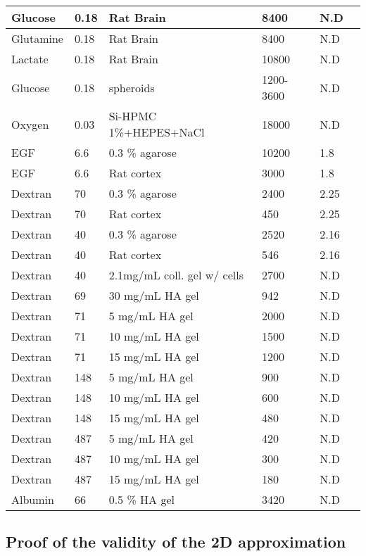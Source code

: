 \documentclass[11pt,a4paper]{article}
\begin{document}
\begin{center}
\begin{tabular}{ |p{18mm}|p{18mm}|p{35mm}|p{25mm}|p{15mm}|p{10mm}| }
 \hline
     Glucose & 0.18 & Rat Brain & 8400 & N.D & \cite{Pfeuffer2000}\\
 \hline
      Glutamine & 0.18 & Rat Brain & 8400 & N.D & \cite{Pfeuffer2000}\\
 \hline
      Lactate & 0.18 & Rat Brain & 10800 & N.D & \cite{Pfeuffer2000}\\
 \hline
      Glucose & 0.18 & spheroids & 1200-3600 & N.D & \cite{Pfeuffer2000}\\
 \hline
    Oxygen & 0.03 & Si-HPMC 1\%+HEPES+NaCl & 18000 & N.D & \cite{Figueiredo2018}\\
 \hline
 EGF & 6.6 & 0.3 \% agarose & 10200 & 1.8 & \cite{Thorne2005}\\
 \hline
 EGF & 6.6 & Rat cortex & 3000 & 1.8 & \cite{Thorne2005}\\
 \hline
 Dextran & 70 & 0.3 \% agarose & 2400 & 2.25 & \cite{Nicholson1994}\\ 
 \hline
 Dextran & 70 & Rat cortex & 450  & 2.25 & \cite{Nicholson1994}\\
 \hline
 Dextran & 40 & 0.3 \% agarose & 2520 & 2.16 & \cite{Nicholson1994}\\
 \hline
 Dextran & 40 & Rat cortex & 546 & 2.16 & \cite{Nicholson1994}\\
 \hline
 Dextran & 40 & 2.1mg/mL coll. gel w/ cells & 2700 & N.D & \cite{Kihara2013} \\
 \hline
  Dextran & 69 & 30 mg/mL HA gel & 942 & N.D & \cite{Shenoy1995} \\
 \hline
   Dextran & 71 & 5 mg/mL HA gel & 2000 & N.D & \cite{DeSmedt1994} \\
 \hline
    Dextran & 71 & 10 mg/mL HA gel & 1500 & N.D & \cite{DeSmedt1994} \\
 \hline
   Dextran & 71 & 15 mg/mL HA gel & 1200 & N.D & \cite{DeSmedt1994} \\
 \hline
   Dextran & 148 & 5 mg/mL HA gel & 900 & N.D & \cite{DeSmedt1994} \\
 \hline
    Dextran & 148 & 10 mg/mL HA gel & 600 & N.D & \cite{DeSmedt1994} \\
 \hline
   Dextran & 148 & 15 mg/mL HA gel & 480 & N.D & \cite{DeSmedt1994} \\
 \hline
    Dextran & 487 & 5 mg/mL HA gel & 420 & N.D & \cite{DeSmedt1994} \\
 \hline
    Dextran & 487 & 10 mg/mL HA gel & 300 & N.D & \cite{DeSmedt1994} \\
 \hline
   Dextran & 487 & 15 mg/mL HA gel & 180 & N.D & \cite{DeSmedt1994} \\
 \hline
   Albumin & 66 & 0.5 \% HA gel & 3420 & N.D & \cite{Winlove1984} \\
 \hline
\end{tabular}
\end{center}
\subsection*{Proof of the validity of the 2D approximation}
\newpage


\end{document}

